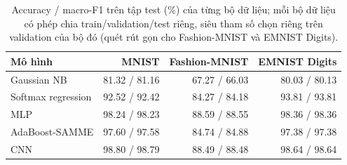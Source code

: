 \begin{table}[tbp]\centering\small
\begin{tabular}{lrrr}
\toprule
Mô hình & MNIST & Fashion-MNIST & EMNIST Digits \\
\midrule
Gaussian NB & 81.32 / 81.16 & 67.27 / 66.03 & 80.03 / 80.13 \\
Softmax regression & 92.52 / 92.42 & 84.27 / 84.18 & 93.81 / 93.81 \\
MLP & 98.24 / 98.23 & 88.59 / 88.55 & 98.36 / 98.36 \\
AdaBoost-SAMME & 97.60 / 97.58 & 84.74 / 84.88 & 97.38 / 97.38 \\
CNN & 98.80 / 98.79 & 88.49 / 88.48 & 98.64 / 98.64 \\
\bottomrule
\end{tabular}
\caption{Accuracy / macro-F1 trên tập test (\%) của từng bộ dữ liệu; mỗi bộ dữ liệu có phép chia train/validation/test riêng, siêu tham số chọn riêng trên validation của bộ đó (quét rút gọn cho Fashion-MNIST và EMNIST Digits).}
\label{tab:datasets}
\end{table}
